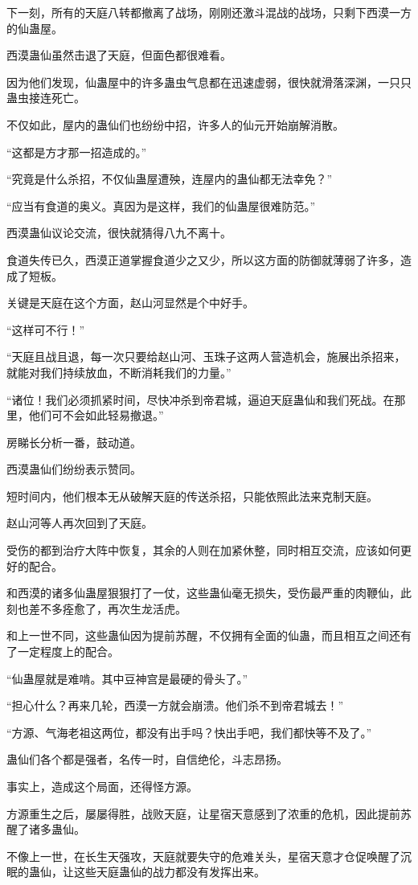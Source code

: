 \begin{this_body}
下一刻，所有的天庭八转都撤离了战场，刚刚还激斗混战的战场，只剩下西漠一方的仙蛊屋。

西漠蛊仙虽然击退了天庭，但面色都很难看。

因为他们发现，仙蛊屋中的许多蛊虫气息都在迅速虚弱，很快就滑落深渊，一只只蛊虫接连死亡。

不仅如此，屋内的蛊仙们也纷纷中招，许多人的仙元开始崩解消散。

“这都是方才那一招造成的。”

“究竟是什么杀招，不仅仙蛊屋遭殃，连屋内的蛊仙都无法幸免？”

“应当有食道的奥义。真因为是这样，我们的仙蛊屋很难防范。”

西漠蛊仙议论交流，很快就猜得八九不离十。

食道失传已久，西漠正道掌握食道少之又少，所以这方面的防御就薄弱了许多，造成了短板。

关键是天庭在这个方面，赵山河显然是个中好手。

“这样可不行！”

“天庭且战且退，每一次只要给赵山河、玉珠子这两人营造机会，施展出杀招来，就能对我们持续放血，不断消耗我们的力量。”

“诸位！我们必须抓紧时间，尽快冲杀到帝君城，逼迫天庭蛊仙和我们死战。在那里，他们可不会如此轻易撤退。”

房睇长分析一番，鼓动道。

西漠蛊仙们纷纷表示赞同。

短时间内，他们根本无从破解天庭的传送杀招，只能依照此法来克制天庭。

赵山河等人再次回到了天庭。

受伤的都到治疗大阵中恢复，其余的人则在加紧休整，同时相互交流，应该如何更好的配合。

和西漠的诸多仙蛊屋狠狠打了一仗，这些蛊仙毫无损失，受伤最严重的肉鞭仙，此刻也差不多痊愈了，再次生龙活虎。

和上一世不同，这些蛊仙因为提前苏醒，不仅拥有全面的仙蛊，而且相互之间还有了一定程度上的配合。

“仙蛊屋就是难啃。其中豆神宫是最硬的骨头了。”

“担心什么？再来几轮，西漠一方就会崩溃。他们杀不到帝君城去！”

“方源、气海老祖这两位，都没有出手吗？快出手吧，我们都快等不及了。”

蛊仙们各个都是强者，名传一时，自信绝伦，斗志昂扬。

事实上，造成这个局面，还得怪方源。

方源重生之后，屡屡得胜，战败天庭，让星宿天意感到了浓重的危机，因此提前苏醒了诸多蛊仙。

不像上一世，在长生天强攻，天庭就要失守的危难关头，星宿天意才仓促唤醒了沉眠的蛊仙，让这些天庭蛊仙的战力都没有发挥出来。

\end{this_body}

